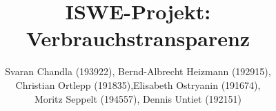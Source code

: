 \documentclass{article}
\begin{document}
\title{ISWE-Projekt: Verbrauchstransparenz}
\author{Svaran Chandla (193922), Bernd-Albrecht Heizmann (192915),\\Christian Ortlepp (191835),Elisabeth Ostryanin (191674),\\Moritz Seppelt (194557), Dennis Untiet (192151)}
\maketitle   
\tableofcontents
\newpage






\end{document}
